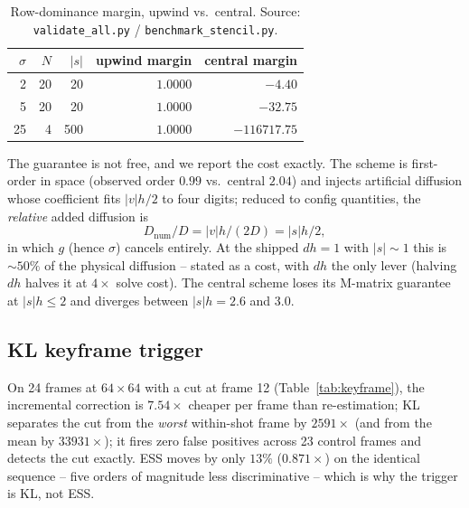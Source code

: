 \begin{table}[t]
  \centering
  \small
  \begin{tabular}{rrrrr}
    \toprule
    $\sigma$ & $N$ & $|s|$ & upwind margin & central margin\\
    \midrule
    2  & 20 & 20  & $1.0000$ & $-4.40$\\
    5  & 20 & 20  & $1.0000$ & $-32.75$\\
    25 & 4  & 500 & $1.0000$ & $-116717.75$\\
    \bottomrule
  \end{tabular}
  \caption{Row-dominance margin, upwind vs.\ central. Source:
  \texttt{validate\_all.py} / \texttt{benchmark\_stencil.py}.}
  \label{tab:stability}
\end{table}

The guarantee is not free, and we report the cost exactly. The scheme is
first-order in space (observed order $0.99$ vs.\ central $2.04$) and injects
artificial diffusion whose coefficient fits $|v|h/2$ to four digits; reduced to
config quantities, the \emph{relative} added diffusion is
\begin{equation}
  D_{\text{num}}/D = |v|h/(2D) = |s|h/2,
  \label{eq:artdiff}
\end{equation}
in which $g$ (hence $\sigma$) cancels entirely. At the shipped $dh{=}1$ with
$|s|\!\sim\!1$ this is $\sim\!50\%$ of the physical diffusion -- stated as a cost,
with $dh$ the only lever (halving $dh$ halves it at $4\times$ solve cost).
The central scheme loses its M-matrix guarantee at $|s|h\le 2$ and diverges
between $|s|h=2.6$ and $3.0$.

\subsection{KL keyframe trigger}
\label{sec:kf-results}
On 24 frames at $64\times64$ with a cut at frame 12 (Table~\ref{tab:keyframe}),
the incremental correction is $\mathbf{7.54\times}$ cheaper per frame than
re-estimation; KL separates the cut from the \emph{worst} within-shot frame by
$2591\times$ (and from the mean by $33931\times$); it fires zero false positives
across 23 control frames and detects the cut exactly. ESS moves by only $13\%$
($0.871\times$) on the identical sequence -- five orders of magnitude less
discriminative -- which is why the trigger is KL, not ESS.

